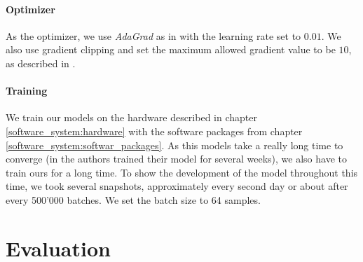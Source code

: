\paragraph{Optimizer} As the optimizer, we use \emph{AdaGrad} \cite{Duchi:2011} as in \cite{Vinyals:2015} with the learning rate set to $0.01$. We also use gradient clipping and set the maximum allowed gradient value to be $10$, as described in \cite{Pascanu:2013}.

\paragraph{Training} We train our models on the hardware described in chapter \ref{software_system:hardware} with the software packages from chapter \ref{software_system:softwar_packages}. As this models take a really long time to converge (in \cite{Vinyals:2015} the authors trained their model for several weeks), we also have to train ours for a long time. To show the development of the model throughout this time, we took several snapshots, approximately every second day or about after every 500'000 batches. We set the batch size to 64 samples.

\section{Evaluation}
\blindtext
